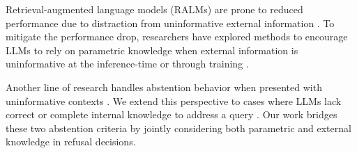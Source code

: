 Retrieval-augmented language models (RALMs) are prone to reduced performance due to distraction from uninformative external information \citep{yoran2023making, shen-etal-2024-assessing}. 
To mitigate the performance drop, researchers have explored methods to encourage LLMs to rely on parametric knowledge when external information is uninformative at the inference-time \citep{yu-etal-2024-chain, park2024enhancing, baek-etal-2023-knowledge-augmented-language} or through training \citep{yoran2023making, asai2024selfrag, xia2024improving, luo-etal-2023-search}.


Another line of research handles abstention behavior when presented with uninformative contexts \citep{wen-etal-2024-characterizing}.
We extend this perspective to cases where LLMs lack correct or complete internal knowledge to address a query \citep{feng-etal-2024-dont, zhang-etal-2024-r, wen2024know}. 
Our work bridges these two abstention criteria by jointly considering both parametric and external knowledge in refusal decisions.


